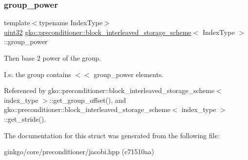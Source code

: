\subsubsection{\texorpdfstring{group\+\_\+power}{group\_power}}
{\footnotesize\ttfamily template$<$typename Index\+Type$>$ \\
\hyperlink{namespacegko_a318c831e3fe269ba04c6ed8bf5a71073}{uint32} \hyperlink{structgko_1_1preconditioner_1_1block__interleaved__storage__scheme}{gko\+::preconditioner\+::block\+\_\+interleaved\+\_\+storage\+\_\+scheme}$<$ Index\+Type $>$\+::group\+\_\+power}



Then base 2 power of the group. 

I.\+e. the group contains { $<$$<$ group\+\_\+power} elements. 

Referenced by gko\+::preconditioner\+::block\+\_\+interleaved\+\_\+storage\+\_\+scheme$<$ index\+\_\+type $>$\+::get\+\_\+group\+\_\+offset(), and gko\+::preconditioner\+::block\+\_\+interleaved\+\_\+storage\+\_\+scheme$<$ index\+\_\+type $>$\+::get\+\_\+stride().



The documentation for this struct was generated from the following file\+:\begin{DoxyCompactItemize}
\item 
ginkgo/core/preconditioner/jacobi.\+hpp (c71510aa)\end{DoxyCompactItemize}
